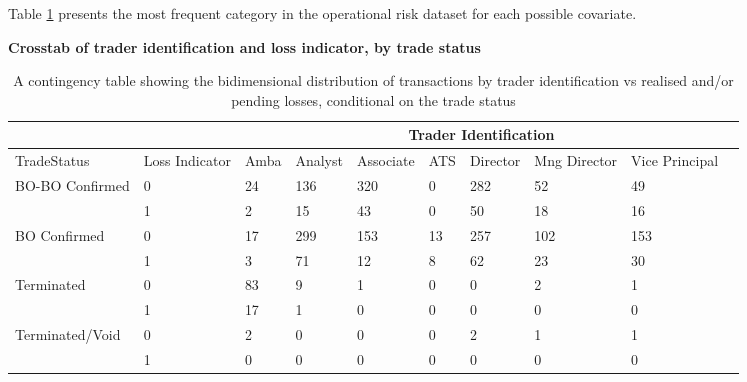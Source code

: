 \documentclass[]{article}
\begin{document}
Table \ref{tab:Crosstab_covariate} presents the most frequent category
in the operational risk dataset for each possible covariate.

\begin{table}[htbp]
        \centering
        \textbf{Crosstab of trader identification and loss indicator, by trade status}
\singlespacing        
        \small
        \setlength\tabcolsep{2pt}
            \begin{tabular}{|p{2cm}|p{2cm}|l|l|l|l|l|l|p{2cm}|p{2cm}|} \hline
            & & \multicolumn{7}{|c|}{Trader Identification} \\ \hline
            TradeStatus & Loss Indicator & Amba & Analyst & Associate & ATS & Director & Mng Director & Vice Principal \\\hline
            \multirow{2}{*}{BO-BO Confirmed} & 0 & 24 & 136 & 320 & 0 & 282 & 52 & 49 \\ \cline{2-9}
                                   & 1 & 2  &  15 & 43 & 0 & 50 & 18 & 16 \\\cline{2-9}
            \multirow{2}{*}{BO Confirmed} & 0 & 17  & 299 & 153 & 13 & 257 & 102 & 153 \\ \cline{2-9}
                                   & 1 &  3 &  71 & 12 & 8 &  62 & 23 & 30 \\ \cline{2-9}
            \multirow{2}{*}{Terminated}       & 0 & 83 & 9 & 1 & 0 & 0 & 2 & 1 \\ \cline{2-9}
                                  & 1 & 17 & 1 & 0 & 0 & 0 & 0 & 0 \\ \cline{2-9}
            \multirow{2}{*}{Terminated/Void}  & 0 & 2 & 0 & 0 & 0 & 2 & 1 & 1 \\ \cline{2-9}
                                   & 1 & 0 & 0 & 0 & 0 & 0 & 0 & 0 \\ \hline
            \end{tabular}
            \caption{A contingency table showing the bidimensional distribution of transactions by trader identification vs realised and/or pending losses, conditional on the trade status}
            \label{tab:Crosstab_covariate}
\end{table}

\doublespacing
\end{document}

